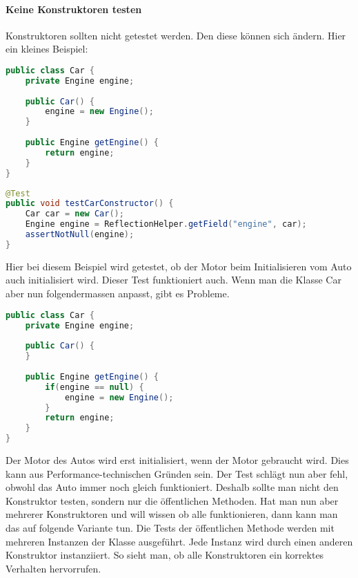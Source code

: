 \paragraph{Keine Konstruktoren testen}
Konstruktoren sollten nicht getestet werden. Den diese können sich ändern. Hier ein kleines Beispiel:
\begin{lstlisting}[language=Java, caption={Klasse Auto}]
public class Car {
	private Engine engine;
	
	public Car() {
		engine = new Engine();
	}
	
	public Engine getEngine() {
		return engine;
	}
}
\end{lstlisting}
\begin{lstlisting}[language=Java, caption={Testklasse}]
@Test
public void testCarConstructor() {
	Car car = new Car();
	Engine engine = ReflectionHelper.getField("engine", car);
	assertNotNull(engine);
}
\end{lstlisting}
Hier bei diesem Beispiel wird getestet, ob der Motor beim Initialisieren vom Auto auch initialisiert wird. Dieser Test funktioniert auch. Wenn man die Klasse Car aber nun folgendermassen anpasst, gibt es Probleme.
\begin{lstlisting}[language=Java, caption={Klasse Auto mit Lazyloading}]
public class Car {
	private Engine engine;
	
	public Car() {
	}
	
	public Engine getEngine() {
		if(engine == null) {
			engine = new Engine();
		}		
		return engine;
	}
}
\end{lstlisting}
Der Motor des Autos wird erst initialisiert, wenn der Motor gebraucht wird. Dies kann aus Performance-technischen Gründen sein. Der Test schlägt nun aber fehl, obwohl das Auto immer noch gleich funktioniert. Deshalb sollte man nicht den Konstruktor testen, sondern nur die öffentlichen Methoden. Hat man nun aber mehrerer Konstruktoren und will wissen ob alle funktionieren, dann kann man das auf folgende Variante tun. Die Tests der öffentlichen Methode werden mit mehreren Instanzen der Klasse ausgeführt. Jede Instanz wird durch einen anderen Konstruktor instanziiert. So sieht man, ob alle Konstruktoren ein korrektes Verhalten hervorrufen.
